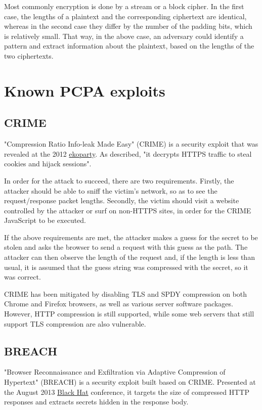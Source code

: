 Most commonly encryption is done by a stream or a block cipher. In the first
case, the lengths of a plaintext and the corresponding ciphertext are identical,
whereas in the second case they differ by the number of the padding bits, which
is relatively small. That way, in the above case, an adversary could identify a
pattern and extract information about the plaintext, based on the lengths of the
two ciphertexts.

\section{Known PCPA exploits}\label{sec:known_pcpa}

\subsection{CRIME}

"Compression Ratio Info-leak Made Easy" (CRIME) \cite{crime} is a security
exploit that was revealed at the 2012 \href{https://www.ekoparty.org}{ekoparty}.
As described, "it decrypts HTTPS traffic to steal cookies and hijack sessions".

In order for the attack to succeed, there are two requirements. Firstly, the
attacker should be able to sniff the victim's network, so as to see the
request/response packet lengths. Secondly, the victim should visit a website
controlled by the attacker or surf on non-HTTPS sites, in order for the CRIME
JavaScript to be executed.

If the above requirements are met, the attacker makes a guess for the secret to
be stolen and asks the browser to send a request with this guess as the path.
The attacker can then observe the length of the request and, if the length is
less than usual, it is assumed that the guess string was compressed with the
secret, so it was correct.

CRIME has been mitigated by disabling TLS and SPDY compression on both Chrome
and Firefox browsers, as well as various server software packages. However, HTTP
compression is still supported, while some web servers that still support TLS
compression are also vulnerable.

\subsection{BREACH}

"Browser Reconnaissance and Exfiltration via Adaptive Compression of Hypertext"
(BREACH) \cite{breach} is a security exploit built based on CRIME. Presented at
the August 2013 \href{https://www.blackhat.com}{Black Hat} conference, it
targets the size of compressed HTTP responses and extracts secrets hidden in the
response body.

